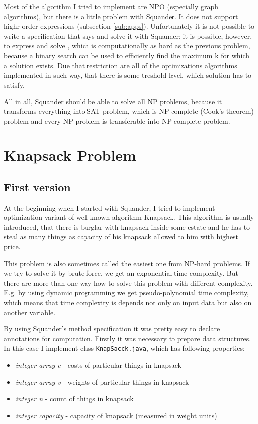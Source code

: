 \documentclass[11pt,twoside,a4paper]{book}
\begin{document}
Most of the algorithm I tried to implement are NPO (especially graph
algorithms), but there is a little problem with Squander. It does not support
highr-order expressions (subsection \ref{sub:apps}). Unfortunately it is not
possible to write a specification that says  and solve it with
Squander; it is possible, however, to express and solve , which is computationally as hard as the previous
problem, because a binary search can be used to efficiently find the maximum k
for which a solution exists. Due that restriction are all of the optimizations
algorithms implemented in such way, that there is some treshold level, which
solution has to satisfy.


All in all, Squander should be able to solve all NP problems, because it
transforms everything into SAT problem, which is NP-complete (Cook's theorem)
problem and every NP problem is transferable into NP-complete problem.
\section{Knapsack Problem}

\subsection{First version}
At the beginning when I started  with Squander, I tried to
implement optimization variant of well known algorithm Knapsack. This algorithm
is usually introduced, that there is burglar with knapsack inside some estate and he has to steal
as many things as capacity of his knapsack allowed to him with highest price. 

This problem is also sometimes called the easiest one from NP-hard problems. If
we try to solve it by brute force, we get an exponential time complexity. But
there are more than one way how to solve this problem with different complexity.
E.g. by using dynamic programming we get pseudo-polynomial time complexity,
which means that time complexity is depends not only on input data but also on
another variable.

By using Squander's method specification it was pretty easy to declare
annotations for computation. Firstly it was necessary to prepare data
structures. In this case I implement class \verb|KnapSacck.java|, which has
following properties:

\begin{itemize}
  \item \textit{integer array c} - costs of particular things in knapsack
  \item \textit{integer array v} - weights of particular things in
  knapsack
  \item \textit{integer n} - count of things in knapsack
  \item \textit{integer capacity} - capacity of knapsack (measured in weight
  units)
\end{itemize}
\end{document}

